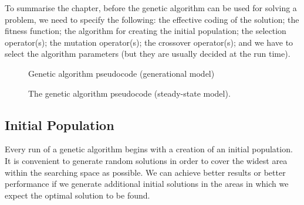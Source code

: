 To summarise the chapter, before the genetic algorithm can be used for solving a problem, we need to specify the following: the effective coding of the solution; the fitness function; the algorithm for creating the initial population; the selection operator(s); the mutation operator(s); the crossover operator(s); and we have to select the algorithm parameters (but they are usually decided at the run time).

\begin{figure}
\centering
\begin{algorithmic}[1]
  \ENDFOR
\end{algorithmic}
\caption{Genetic algorithm pseudocode (generational model)}
\label{fig:ga_pseudocode_dynamic}
\end{figure}

\begin{figure}
\centering
\begin{algorithmic}[1]
  \ENDFOR
\end{algorithmic}
\caption{The genetic algorithm pseudocode (steady-state model).}
\label{fig:ga_pseudocode_static}
\end{figure}

\subsection{Initial Population}

Every run of a genetic algorithm begins with a creation of an initial population. It is convenient to generate random solutions in order to cover the widest area within the searching space as possible. We can achieve better results or better performance if we generate additional initial solutions in the areas in which we expect the optimal solution to be found.

